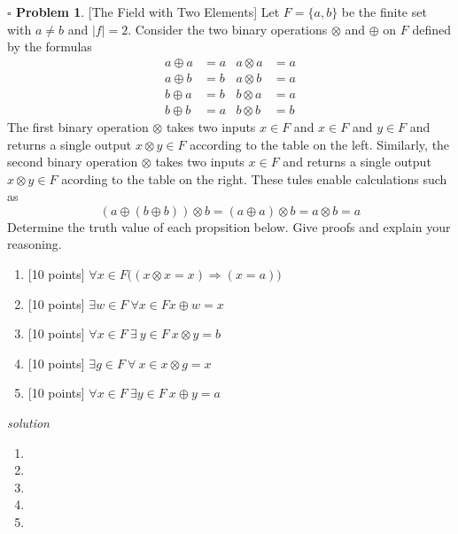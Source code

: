 \documentclass[11pt,twoside]{amsart}
\theoremstyle{definition}
\newtheorem{bprob}{$\square$ Problem}
\begin{document}
\begin{bprob} %
  {[The Field with Two Elements]} Let $F = \{ a,b\}$ be the finite set with $a \neq b$ and $|f| = 2$. Consider the two binary operations $\otimes$ and $\oplus$ on $F$ defined by the formulas 
  \begin{align*}
    a \oplus a &= a     &a \otimes a &= a \\
    a \oplus b &= b     &a \otimes b &= a \\
    b \oplus a &= b     &b \otimes a &= a \\
    b \oplus b &= a     &b \otimes b &= b
  \end{align*}
  The first binary operation $\otimes$ takes two inputs $x \in F$ and $x \in F$ and $y \in F$ and returns a single output $x \otimes y \in F$ according to the table on the left. Similarly, the second binary operation $\otimes$ takes two inputs $x \in F$ and returns a single output $x \otimes y \in F$ acording to the table on the right. These tules enable calculations such as
  $$(a \oplus (b \oplus b)) \otimes b = (a \oplus a) \otimes b = a \otimes b = a$$
Determine the truth value of each propsition below. Give proofs and explain your reasoning. 
    \begin{enumerate}[label= 2.\arabic*, itemsep=0.2cm]
        \item %
          {[10 points]} $\forall x \in F \Big((x\otimes x = x) \Rightarrow (x = a) \Big)$
        \item %
          {[10 points]} $\exists w \in F \ \forall x \in F x \oplus w = x$
        \item %
          {[10 points]} $\forall x \in F \ \exists \ y \in F \ x \otimes y = b$

        \item %
          {[10 points]} $\exists g \in F \ \forall \ x \in x \otimes g = x $
        \item %
          {[10 points]} $\forall x \in F \ \exists y \in F \ x \oplus y = a $

    \end{enumerate}
\end{bprob}
\emph{solution}
    \begin{enumerate}[label= 1.\arabic*, itemsep=0.4cm]
        \item %
        \item %
        \item %
        \item %
        \item %
    \end{enumerate}
\end{document}
